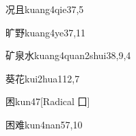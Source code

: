 \begin{verbete}{况且}{kuang4qie3}{7,5}
\end{verbete}

\begin{verbete}{旷野}{kuang4ye3}{7,11}
\end{verbete}

\begin{verbete}{矿泉水}{kuang4quan2shui3}{8,9,4}
\end{verbete}

\begin{verbete}{葵花}{kui2hua1}{12,7}
\end{verbete}

\begin{verbete}{困}{kun4}{7}[Radical ⼞]
\end{verbete}

\begin{verbete}{困难}{kun4nan5}{7,10}
\end{verbete}


